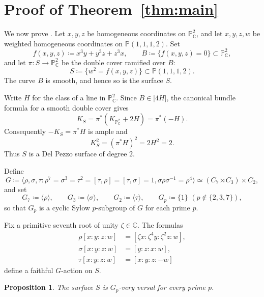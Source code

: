 \documentclass{amsart}
\newtheorem{prop}[prop]{Proposition}
\theoremstyle{definition}
\theoremstyle{remark}
\numberwithin{equation}{section}
\newcommand{\C}{\mathbb C}
\renewcommand{\P}{\mathbb P}
\newcommand{\ang}[1]{\langle{#1}\rangle}
\begin{document}
\section{Proof of Theorem~\ref{thm:main}}\label{sec:proof}

We now prove . Let $x,y,z$ be homogeneous coordinates on $\P^2_\C$, and let $x,y,z,w$ be weighted homogeneous coordinates on $\P(1,1,1,2)$. Set
\[
 f(x,y,z)\coloneqq x^3y+y^3z+z^3x,
 \qquad
 B\coloneqq \{f(x,y,z)=0\}\subset\mathbb P^2_\C,
\]
and let $\pi:S\to\mathbb P^2_\C$ be the double cover ramified over $B$:
\[
 S\coloneqq\{w^2=f(x,y,z)\}\subset\mathbb P(1,1,1,2).
\]
The curve $B$ is smooth, and hence so is the surface $S$.

Write $H$ for the class of a line in $\mathbb P^2_\C$.  Since $B\in|4H|$,
the canonical bundle formula for a smooth double cover gives
\[
 K_S=\pi^*(K_{\P^2_\C}+2H)=\pi^*(-H).
\]
Consequently $-K_S=\pi^*H$ is ample and 
\[
 K_S^2=(\pi^*H)^2=2H^2=2.
\] Thus $S$ is a Del Pezzo surface of degree $2$.

Define
\[G\coloneqq \langle \rho,\sigma,\tau : \rho^7=\sigma^3=\tau^2=[\tau,\rho]=[\tau,\sigma]=1, \sigma\rho\sigma^{-1}=\rho^4\rangle\simeq (C_7\rtimes C_3)\times C_2,\]
and set
\[
 G_7\coloneqq\ang{\rho},\qquad G_3\coloneqq\ang{\sigma},\qquad G_2\coloneqq\ang{\tau},\qquad G_p\coloneqq\{1\}\,\,(p\notin\{2,3,7\}),
\]
so that $G_p$ is a cyclic Sylow $p$-subgroup of $G$ for each prime $p$.

Fix a primitive seventh root of unity $\zeta\in\C$.  The formulas
\begin{align*}
 \rho[x:y:z:w]&=[\zeta x:\zeta^4y:\zeta^2z:w],\\
 \sigma[x:y:z:w]&=[y:z:x:w],\\
 \tau[x:y:z:w]&=[x:y:z:-w]
\end{align*}
define a faithful $G$-action on $S$.

\begin{prop}\label{prop:sylow-very-versal}
The surface $S$ is $G_p$-very versal for every prime $p$.
\end{prop}
\end{document}
